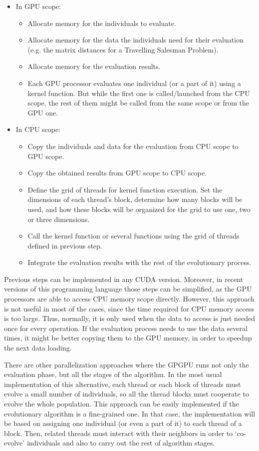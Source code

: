 \documentclass{article}
\begin{document}
\begin{itemize}
\item In GPU scope:
	\begin{itemize}
		\item Allocate memory for the individuals to evaluate.
		\item Allocate memory for the data the individuals need for their evaluation (e.g. the matrix distances for a Travelling Salesman Problem).
		\item Allocate memory for the evaluation results.
		\item Each GPU processor evaluates one individual (or a part of it) using a kernel function. But while the first one is called/launched from the CPU scope, the rest of them might be called from the same scope or from the GPU one.
	\end{itemize}  
\item In CPU scope:
	\begin{itemize}
		\item Copy the individuals and data for the evaluation from CPU scope to GPU scope.
		\item Copy the obtained results from GPU scope to CPU scope. 
		\item Define the grid of threads for kernel function execution. Set the dimensions of each thread's block, determine how many blocks will be used, and how these blocks will be organized for the grid to use one, two or three dimensions.
		\item Call the kernel function or several functions using the grid of threads defined in previous step.
		\item Integrate the evaluation results with the rest of the evolutionary process.
	\end{itemize}  
\end{itemize}

Previous steps can be implemented in any CUDA version. Moreover, in
recent versions of this programming language those steps can be
simplified, as the GPU processors are able to access CPU memory scope
directly. 
However, this approach is not useful in most of the cases, since the
time required for CPU memory access is too large. Thus, normally, it
is only used when the data to access is just needed once for every
operation. If the evaluation process needs to use the data several
times, it might be better copying them to the GPU memory, in order to
speedup the next data loading. 

There are other parallelization approaches where the GPGPU runs not
only the evaluation phase, but all the stages of the algorithm.  
In the most usual implementation of this alternative, each thread or each block of threads must evolve a small number of individuals, so all the thread blocks must cooperate to evolve the whole population. 
This approach can be easily implemented if the evolutionary algorithm is a fine-grained one. 
In that case, the implementation will be based on assigning one
individual (or even a part of it) to each thread of a block. Then,
related threads must interact with their neighbors in order to
`co-evolve' individuals and also to carry out the rest of algorithm
stages.  
\end{document}
